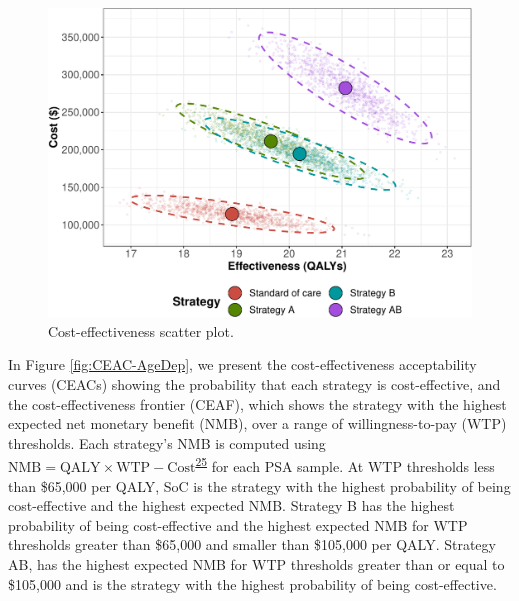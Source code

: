 \documentclass[
]{article}
\begin{document}
\begin{figure}[H]

{\centering \includegraphics{figs/CE-scatter-TimeDep-1} 

}

\caption{Cost-effectiveness scatter plot.}\label{fig:CE-scatter-TimeDep}
\end{figure}

In Figure \ref{fig:CEAC-AgeDep}, we present the cost-effectiveness acceptability curves (CEACs) showing the probability that each strategy is cost-effective, and the cost-effectiveness frontier (CEAF), which shows the strategy with the highest expected net monetary benefit (NMB), over a range of willingness-to-pay (WTP) thresholds. Each strategy's NMB is computed using \(\text{NMB} = \text{QALY} \times \text{WTP} - \text{Cost}\)\textsuperscript{\protect\hyperlink{ref-Stinnett1998b}{25}} for each PSA sample. At WTP thresholds less than \$65,000 per QALY, SoC is the strategy with the highest probability of being cost-effective and the highest expected NMB. Strategy B has the highest probability of being cost-effective and the highest expected NMB for WTP thresholds greater than \$65,000 and smaller than \$105,000 per QALY. Strategy AB, has the highest expected NMB for WTP thresholds greater than or equal to \$105,000 and is the strategy with the highest probability of being cost-effective.
\end{document}
